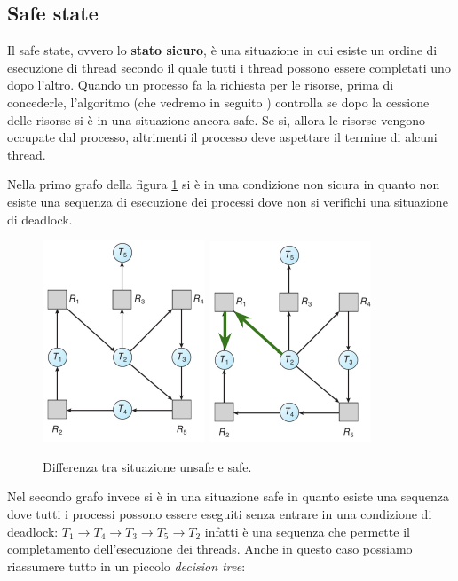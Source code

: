 \subsection{Safe state}
Il safe state, ovvero lo \textbf{stato sicuro}, è una situazione in cui esiste un ordine di esecuzione di thread secondo il quale tutti i thread possono essere completati uno dopo l'altro. Quando un processo fa la richiesta per le risorse, prima di concederle, l'algoritmo (che vedremo in seguito ) controlla se dopo la cessione delle risorse si è in una situazione ancora safe. Se si, allora le risorse vengono occupate dal processo, altrimenti il processo deve aspettare il termine di alcuni thread.

Nella primo grafo della figura \ref{fig:safe_unsafe} si è in una condizione non sicura in quanto non esiste una sequenza di esecuzione dei processi dove non si verifichi una situazione di deadlock. 
\begin{figure}[h]
    \centering
    \includegraphics[width = .35\textwidth]{../res/imgs/deadlocks/unsafe.png}
    \hspace{5em}
    \includegraphics[width = .35\textwidth]{../res/imgs/deadlocks/safe.png}
    \caption{Differenza tra situazione unsafe e safe.}
    \label{fig:safe_unsafe}
\end{figure}
Nel secondo grafo invece si è in una situazione safe in quanto esiste una sequenza dove tutti i processi possono essere eseguiti senza entrare in una condizione di deadlock: $T_1 \to T_4 \to T_3 \to T_5 \to T_2$ infatti è una sequenza che permette il completamento dell'esecuzione dei threads. Anche in questo caso possiamo riassumere tutto in un piccolo \textit{decision tree}:
